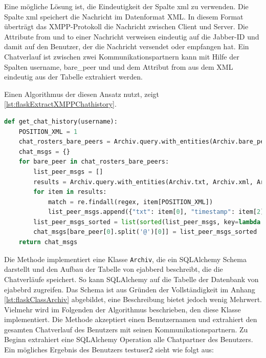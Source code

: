 \documentclass[a4paper,titlepage,halfparskip,12pt]{scrreprt}
\begin{document}
\begin{onehalfspacing}
Eine mögliche Lösung ist, die Eindeutigkeit der Spalte xml zu verwenden. Die Spalte xml speichert die Nachricht im Datenformat \acs{XML}. In diesem Format überträgt das \acs{XMPP}-Protokoll die Nachricht zwischen Client und Server. Die Attribute from und to einer Nachricht verweisen eindeutig auf die Jabber-ID und damit auf den Benutzer, der die Nachricht versendet oder empfangen hat. Ein Chatverlauf ist zwischen zwei Kommunikationspartnern kann mit Hilfe der Spalten username, bare\_peer und und dem Attribut from aus dem \acs{XML} eindeutig aus der Tabelle extrahiert werden.

Einen Algorithmus der diesen Ansatz nutzt, zeigt \autoref{lst:flaskExtractXMPPChathistory}.

\begin{lstlisting}[language=python, caption={Code für die Extrahierung des Chatverlaufes von ejabberd}, label={lst:flaskExtractXMPPChathistory}]
def get_chat_history(username):
    POSITION_XML = 1
    chat_rosters_bare_peers = Archiv.query.with_entities(Archiv.bare_peer).filter_by(username=username).group_by("bare_peer").all()
    chat_msgs = {}
    for bare_peer in chat_rosters_bare_peers:
        list_peer_msgs = []
        results = Archiv.query.with_entities(Archiv.txt, Archiv.xml, Archiv.created_at, Archiv.kind).filter_by(username=username).filter_by(bare_peer=bare_peer[0]).all()
        for item in results:
            match = re.findall(regex, item[POSITION_XML])
            list_peer_msgs.append({"txt": item[0], "timestamp": item[2].strftime('%Y-%m-%d %H:%M:%S'), "type": item[3], "from": match[0]})
        list_peer_msgs_sorted = list(sorted(list_peer_msgs, key=lambda k: k["timestamp"]))
        chat_msgs[bare_peer[0].split('@')[0]] = list_peer_msgs_sorted
    return chat_msgs
\end{lstlisting}

Die Methode implementiert eine Klasse \texttt{Archiv}, die ein SQLAlchemy Schema darstellt und den Aufbau der Tabelle von ejabberd beschreibt, die die Chatverläufe speichert. So kann SQLAlchemy auf die Tabelle der Datenbank von ejabebrd zugreifen. Das Schema ist aus Gründen der Vollständigkeit im Anhang \autoref{lst:flaskClassArchiv} abgebildet, eine Beschreibung bietet jedoch wenig Mehrwert. Vielmehr wird im Folgenden der Algorithmus beschrieben, den diese Klasse implementiert.
Die Methode akzeptiert einen Benutzernamen und extrahiert den gesamten Chatverlauf des Benutzers mit seinen Kommunikationspartnern. Zu Beginn extrahiert eine SQLAlchemy Operation alle Chatpartner des Benutzers.
Ein mögliches Ergebnis des Benutzers testuser2 sieht wie folgt aus:


\end{onehalfspacing}
\end{document}
